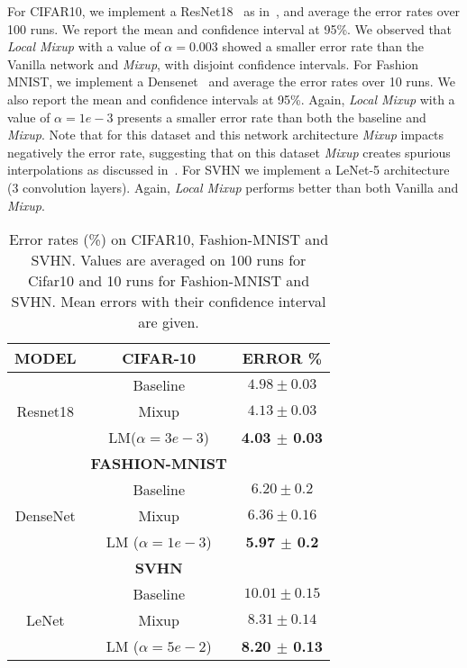 \documentclass[twoside]{article}
\numberwithin{intassumption}{assumption}
\begin{document}
For CIFAR10, we implement a ResNet18~\citep{resnet} as in~\citep{zhang2017mixup}, and average the error rates over 100 runs. We report the mean and confidence interval at 95\%. We observed that \emph{Local Mixup} with a value of $\alpha = 0.003$ showed a smaller error rate than the Vanilla network and \emph{Mixup}, with disjoint confidence intervals.
For Fashion MNIST, we implement a Densenet~\citep{densenet} and average the error rates over 10 runs. We also report the mean and confidence intervals at 95\%. Again, \emph{Local Mixup} with a value of $\alpha = 1e-3$ presents a smaller error rate than both the baseline and \emph{Mixup}. Note that for this dataset and this network architecture \emph{Mixup} impacts negatively the error rate, suggesting that on this dataset \emph{Mixup} creates spurious interpolations as discussed in~\cite{guo2019mixup}.
For SVHN we implement a LeNet-5\citep{lenet} architecture (3 convolution layers). Again, \emph{Local Mixup} performs better than both Vanilla and \emph{Mixup}.
\begin{table}[]
    \centering
        \caption{Error rates (\%) on CIFAR10, Fashion-MNIST and SVHN. Values are averaged on 100 runs for Cifar10 and 10 runs for Fashion-MNIST and SVHN. Mean errors with their confidence interval are given.}
    \begin{tabular}{c c c}
     \hline
    \textbf{MODEL} & \textbf{CIFAR-10} & \textbf{ERROR \%} \\
    \hline
&Baseline & $4.98 \pm  0.03$  \\
Resnet18 &Mixup & $4.13   \pm 0.03$   \\
&LM($\alpha = 3e-3$) & \textbf{ 4.03 $\pm$ 0.03}\\
\hline 
&\textbf{FASHION-MNIST}&  \\
\hline 
&Baseline & $6.20 \pm 0.2$  \\
DenseNet&Mixup & $6.36   \pm 0.16$   \\
&LM ($\alpha = 1e-3$) & \textbf{5.97 $\pm$ 0.2} \\
\hline
&\textbf{SVHN}&  \\ 
\hline
&Baseline & $10.01 \pm 0.15$  \\
LeNet &Mixup & $8.31  \pm 0.14$   \\
&LM ($\alpha = 5e-2$) & \textbf{8.20 $\pm$ 0.13} \\
    \end{tabular}
    \label{tab:ErrCifar10}
\vspace{-0.1cm}
\end{table}
\end{document}
